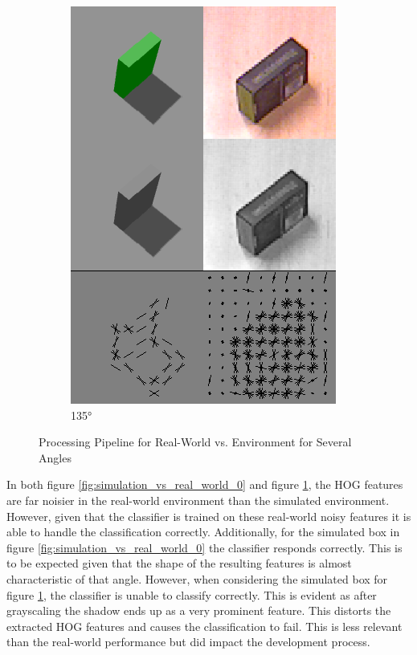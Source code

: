 \documentclass[letterpaper, 10 pt, conference]{conf/ieeeconf}  %
\begin{document}
\begin{figure}[H]
\begin{subfigure}[b]{0.238\textwidth}
    \includegraphics[width=\textwidth]{simulation_vs_real_world_broken.png}
    \caption{\label{fig:simulation_vs_real_world_135}\ang{135}}
  \end{subfigure}
  \caption{\label{fig:pipelines} Processing Pipeline for Real-World vs.
    Environment for Several Angles}
\end{figure}

In both figure \ref{fig:simulation_vs_real_world_0} and figure
\ref{fig:simulation_vs_real_world_135}, the HOG features are far noisier in the
real-world environment than the simulated environment. However, given that the
classifier is trained on these real-world noisy features it is able to handle
the classification correctly. Additionally, for the simulated box in figure
\ref{fig:simulation_vs_real_world_0} the classifier responds correctly. This is
to be expected given that the shape of the resulting features is almost
characteristic of that angle. However, when considering the simulated box for
figure \ref{fig:simulation_vs_real_world_135}, the classifier is unable to
classify correctly. This is evident as after grayscaling the shadow ends up as a
very prominent feature. This distorts the extracted HOG features and causes the
classification to fail. This is less relevant than the real-world performance
but did impact the development process.\\
\end{document}
